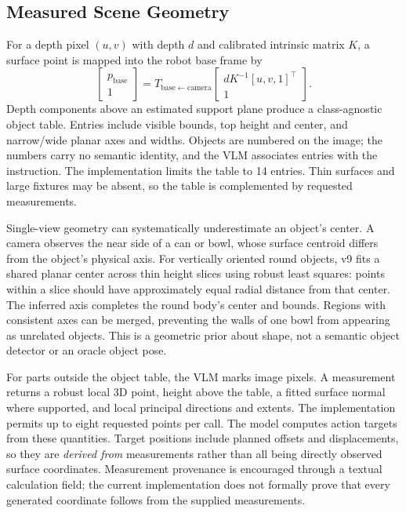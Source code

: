 \subsection{Measured Scene Geometry}
For a depth pixel $(u,v)$ with depth $d$ and calibrated intrinsic matrix $K$, a surface point is mapped into the robot base frame by
\begin{equation}
 \begin{bmatrix}p_{\mathrm{base}}\\1\end{bmatrix}
 = T_{\mathrm{base}\leftarrow\mathrm{camera}}
 \begin{bmatrix}dK^{-1}[u,v,1]^\top\\1\end{bmatrix}.
\end{equation}
Depth components above an estimated support plane produce a class-agnostic object table. Entries include visible bounds, top height and center, and narrow/wide planar axes and widths. Objects are numbered on the image; the numbers carry no semantic identity, and the VLM associates entries with the instruction. The implementation limits the table to 14 entries. Thin surfaces and large fixtures may be absent, so the table is complemented by requested measurements.

Single-view geometry can systematically underestimate an object's center. A camera observes the near side of a can or bowl, whose surface centroid differs from the object's physical axis. For vertically oriented round objects, v9 fits a shared planar center across thin height slices using robust least squares: points within a slice should have approximately equal radial distance from that center. The inferred axis completes the round body's center and bounds. Regions with consistent axes can be merged, preventing the walls of one bowl from appearing as unrelated objects. This is a geometric prior about shape, not a semantic object detector or an oracle object pose.

For parts outside the object table, the VLM marks image pixels. A measurement returns a robust local 3D point, height above the table, a fitted surface normal where supported, and local principal directions and extents. The implementation permits up to eight requested points per call. The model computes action targets from these quantities. Target positions include planned offsets and displacements, so they are \emph{derived from} measurements rather than all being directly observed surface coordinates. Measurement provenance is encouraged through a textual calculation field; the current implementation does not formally prove that every generated coordinate follows from the supplied measurements.

